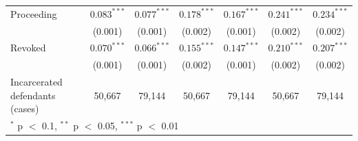 \begin{tabular}{lcccccc}
Proceeding & $0.083^{***}$ & $0.077^{***}$ & $0.178^{***}$ & $0.167^{***}$ & $0.241^{***}$ & $0.234^{***}$ \\
 & (0.001) & (0.001) & (0.002) & (0.001) & (0.002) & (0.002) \\
Revoked & $0.070^{***}$ & $0.066^{***}$ & $0.155^{***}$ & $0.147^{***}$ & $0.210^{***}$ & $0.207^{***}$ \\
 & (0.001) & (0.001) & (0.002) & (0.001) & (0.002) & (0.002) \\
\midrule
Incarcerated defendants (cases) & 50,667 & 79,144 & 50,667 & 79,144 & 50,667 & 79,144 \\
\bottomrule
\multicolumn{7}{l}{\footnotesize $^{*}$ p $<$ 0.1, $^{**}$ p $<$ 0.05, $^{***}$ p $<$ 0.01} \\
\end{tabular}
